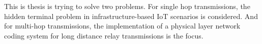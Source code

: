 \label{chapter:problem}

\newlength{\savedunitlength}
\setlength{\unitlength}{2em}

This is thesis is trying to solve two problems. For single hop transmissions, the hidden terminal problem in infrastructure-based IoT scenarios is considered. And for multi-hop transmissions, the implementation of a physical layer network coding system for long distance relay transmissions is the focus.


\setlength{\unitlength}{\savedunitlength}
